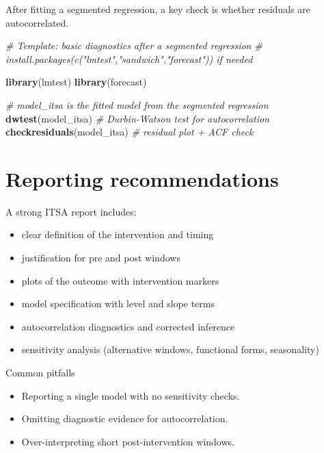 \documentclass[
  11pt,
  oneside]{book}
\newenvironment{Shaded}{\begin{snugshade}}{\end{snugshade}}
\newcommand{\CommentTok}[1]{\textcolor[rgb]{0.56,0.35,0.01}{\textit{#1}}}
\newcommand{\FunctionTok}[1]{\textcolor[rgb]{0.13,0.29,0.53}{\textbf{#1}}}
\newcommand{\NormalTok}[1]{#1}
\providecommand{\tightlist}{%
  \setlength{\itemsep}{0pt}\setlength{\parskip}{0pt}}
\begin{document}
After fitting a segmented regression, a key check is whether residuals are autocorrelated.

\begin{Shaded}
\begin{Highlighting}[]
\CommentTok{\# Template: basic diagnostics after a segmented regression}
\CommentTok{\# install.packages(c("lmtest","sandwich","forecast")) if needed}

\FunctionTok{library}\NormalTok{(lmtest)}
\FunctionTok{library}\NormalTok{(forecast)}

\CommentTok{\# model\_itsa is the fitted model from the segmented regression}
\FunctionTok{dwtest}\NormalTok{(model\_itsa)                 }\CommentTok{\# Durbin{-}Watson test for autocorrelation}
\FunctionTok{checkresiduals}\NormalTok{(model\_itsa)         }\CommentTok{\# residual plot + ACF check}
\end{Highlighting}
\end{Shaded}

\section{Reporting recommendations}\label{reporting-recommendations}

A strong ITSA report includes:

\begin{itemize}
\tightlist
\item
  clear definition of the intervention and timing
\item
  justification for pre and post windows
\item
  plots of the outcome with intervention markers
\item
  model specification with level and slope terms
\item
  autocorrelation diagnostics and corrected inference
\item
  sensitivity analysis (alternative windows, functional forms, seasonality)
\end{itemize}

Common pitfalls

\begin{itemize}
\tightlist
\item
  Reporting a single model with no sensitivity checks.
\item
  Omitting diagnostic evidence for autocorrelation.
\item
  Over-interpreting short post-intervention windows.
\end{itemize}
\end{document}
